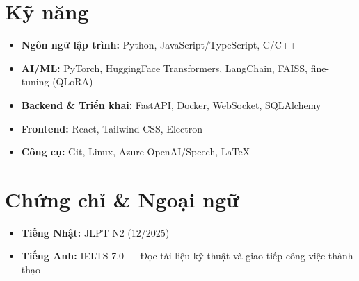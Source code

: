 \documentclass[a4paper,10pt]{article}
\begin{document}
\section{Kỹ năng}
\begin{itemize}
  \item \textbf{Ngôn ngữ lập trình:} Python, JavaScript/TypeScript, C/C++
  \item \textbf{AI/ML:} PyTorch, HuggingFace Transformers, LangChain, FAISS, fine-tuning (QLoRA)
  \item \textbf{Backend \& Triển khai:} FastAPI, Docker, WebSocket, SQLAlchemy
  \item \textbf{Frontend:} React, Tailwind CSS, Electron
  \item \textbf{Công cụ:} Git, Linux, Azure OpenAI/Speech, \LaTeX
\end{itemize}

\section{Chứng chỉ \& Ngoại ngữ}
\begin{itemize}
  \item \textbf{Tiếng Nhật:} JLPT N2 (12/2025)
  \item \textbf{Tiếng Anh:} IELTS 7.0 --- Đọc tài liệu kỹ thuật và giao tiếp công việc thành thạo
\end{itemize}
\end{document}
